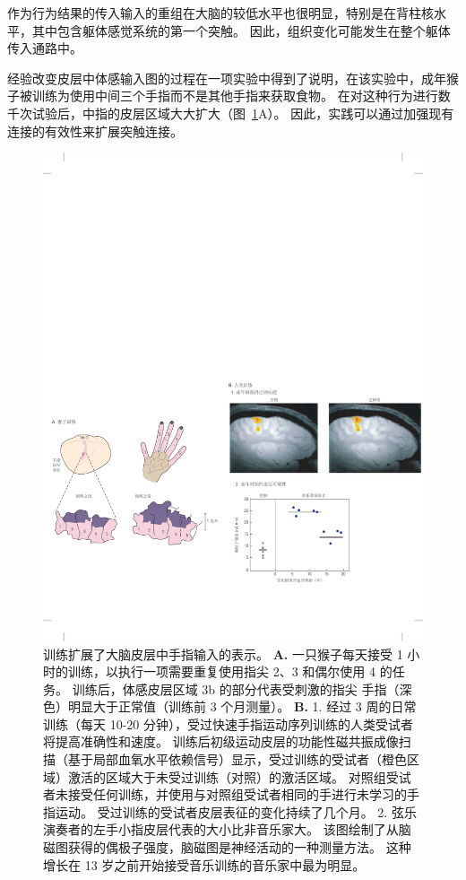 作为行为结果的传入输入的重组在大脑的较低水平也很明显，特别是在背柱核水平，其中包含躯体感觉系统的第一个突触。
因此，组织变化可能发生在整个躯体传入通路中。


经验改变皮层中体感输入图的过程在一项实验中得到了说明，在该实验中，成年猴子被训练为使用中间三个手指而不是其他手指来获取食物。
在对这种行为进行数千次试验后，中指的皮层区域大大扩大（图~\ref{fig:53_16}A）。
因此，实践可以通过加强现有连接的有效性来扩展突触连接。


\begin{figure}[htbp]
	\centering
	\includegraphics[width=1.0\linewidth]{chap53/fig_53_16}
	\caption{训练扩展了大脑皮层中手指输入的表示。
		\textbf{A.} 一只猴子每天接受 1 小时的训练，以执行一项需要重复使用指尖 2、3 和偶尔使用 4 的任务。
		训练后，体感皮层区域 3b 的部分代表受刺激的指尖 手指（深色）明显大于正常值（训练前 3 个月测量）\cite{jenkins1990functional}。
		\textbf{B.} 1. 经过 3 周的日常训练（每天 10-20 分钟），受过快速手指运动序列训练的人类受试者将提高准确性和速度。
		训练后初级运动皮层的功能性磁共振成像扫描（基于局部血氧水平依赖信号）显示，受过训练的受试者（橙色区域）激活的区域大于未受过训练（对照）的激活区域。
		对照组受试者未接受任何训练，并使用与对照组受试者相同的手进行未学习的手指运动。
		受过训练的受试者皮层表征的变化持续了几个月。
		2. 弦乐演奏者的左手小指皮层代表的大小比非音乐家大。
		该图绘制了从脑磁图获得的偶极子强度，脑磁图是神经活动的一种测量方法。
		这种增长在 13 岁之前开始接受音乐训练的音乐家中最为明显\cite{elbert1995increased}。}
	\label{fig:53_16}
\end{figure}


